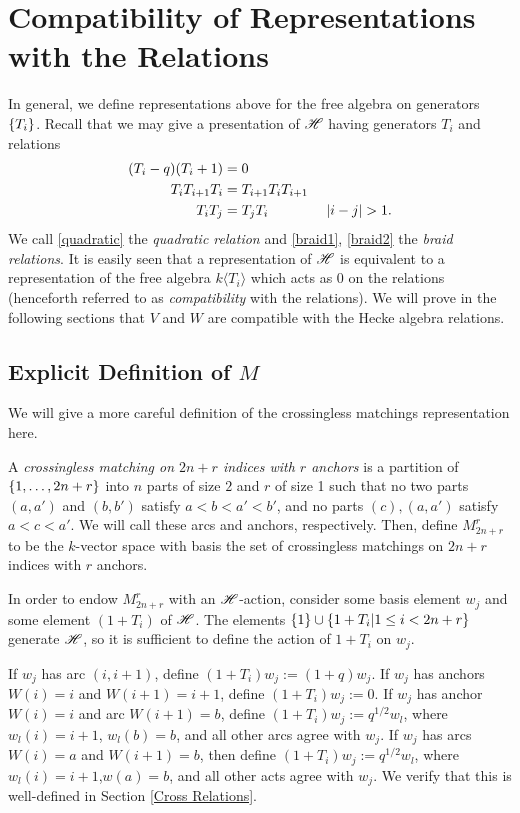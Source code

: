 \documentclass{amsart}
\begin{document}
\section{Compatibility of Representations with the Relations}
In general, we define representations above for the free algebra on generators $\left\{ T_i \right\}$.
Recall that we may give a presentation of $\mathscr{H}$ having generators $T_i$ and relations
\begin{align}
  (T_i - q)(T_i + 1) &= 0 \label{quadratic}\\
  T_iT_{i+1}T_i &= T_{i+1}T_iT_{i+1} \label{braid1}\\ 
  T_iT_j &= T_jT_i \hspace{40pt} \left| i - j \right| > 1. \label{braid2}
\end{align}
We call \eqref{quadratic} the \emph{quadratic relation} and \eqref{braid1}, \eqref{braid2} the \emph{braid relations}.
It is easily seen that a representation of $\mathscr{H}$ is equivalent to a representation of the free algebra $k\langle T_i \rangle$ which acts as 0 on the relations (henceforth referred to as \emph{compatibility} with the relations).
We will prove in the following sections that $V$ and $W$ are compatible with the Hecke algebra relations.

\subsection{Explicit Definition of $M$}
We will give a more careful definition of the crossingless matchings representation here.
\begin{definition}
  A \emph{crossingless matching on $2n+r$ indices with $r$ anchors} is a partition of $\left\{ 1,\dots,2n+r \right\}$ into $n$ parts of size $2$ and $r$ of size 1 such that no two parts $(a,a')$ and $(b,b')$ satisfy $a < b < a' < b'$, and no parts $(c), (a,a')$ satisfy $a < c < a'$.
  We will call these arcs and anchors, respectively.
  Then, define $M^r_{2n+r}$ to be the $k$-vector space with basis the set of crossingless matchings on $2n+r$ indices with $r$ anchors.

  In order to endow $M^r_{2n + r}$ with an $\mathscr{H}$-action, consider some basis element $w_j$ and some element $(1 + T_i)$ of $\mathscr{H}$.
  The elements $\left\{ 1 \right\} \cup \left\{ 1 + T_i | 1 \leq i < 2n + r \right\}$ generate $\mathscr{H}$, so it is sufficient to define the action of $1 + T_i$ on $w_j$.

  If $w_j$ has arc $(i,i+1)$, define $(1 + T_i)w_j := (1 + q)w_j$.
  If $w_j$ has anchors $W(i) = i$ and $W(i+1) = i+1$, define $(1 + T_i)w_j := 0$.
  If $w_j$ has anchor $W(i) = i$ and arc $W(i+1) = b$, define $(1 + T_i)w_j := q^{1/2}w_l$, where $w_l(i) = i+1$, $w_l(b) = b$, and all other arcs agree with $w_j$.
  If $w_j$ has arcs $W(i) = a$ and $W(i+1) = b$, then define $(1 + T_i)w_j := q^{1/2}w_l$, where $w_l(i) = i+1$,$w(a) = b$, and all other acts agree with $w_j$. 
  We verify that this is well-defined in Section \ref{Cross Relations}.
\end{definition}
\end{document}
